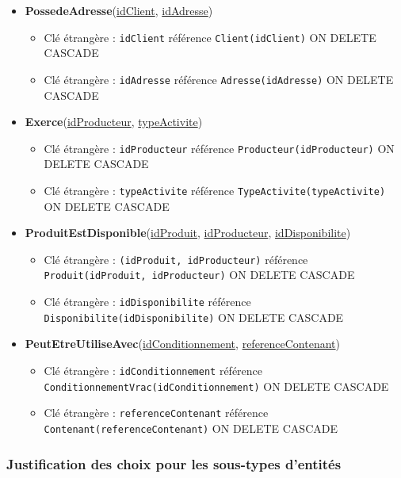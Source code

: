 \begin{itemize}
    \item \textbf{PossedeAdresse}(\underline{idClient}, \underline{idAdresse})
    \begin{itemize}
        \item Clé étrangère : \texttt{idClient} référence \texttt{Client(idClient)} ON DELETE CASCADE
        \item Clé étrangère : \texttt{idAdresse} référence \texttt{Adresse(idAdresse)} ON DELETE CASCADE
    \end{itemize}
    
    \item \textbf{Exerce}(\underline{idProducteur}, \underline{typeActivite})
    \begin{itemize}
        \item Clé étrangère : \texttt{idProducteur} référence \texttt{Producteur(idProducteur)} ON DELETE CASCADE
        \item Clé étrangère : \texttt{typeActivite} référence \texttt{TypeActivite(typeActivite)} ON DELETE CASCADE
    \end{itemize}
    
    \item \textbf{ProduitEstDisponible}(\underline{idProduit}, \underline{idProducteur}, \underline{idDisponibilite})
    \begin{itemize}
        \item Clé étrangère : \texttt{(idProduit, idProducteur)} référence \texttt{Produit(idProduit, idProducteur)} ON DELETE CASCADE
        \item Clé étrangère : \texttt{idDisponibilite} référence \texttt{Disponibilite(idDisponibilite)} ON DELETE CASCADE
    \end{itemize}
    
    \item \textbf{PeutEtreUtiliseAvec}(\underline{idConditionnement}, \underline{referenceContenant})
    \begin{itemize}
        \item Clé étrangère : \texttt{idConditionnement} référence \texttt{ConditionnementVrac(idConditionnement)} ON DELETE CASCADE
        \item Clé étrangère : \texttt{referenceContenant} référence \texttt{Contenant(referenceContenant)} ON DELETE CASCADE
    \end{itemize}
\end{itemize}

\subsubsection{Justification des choix pour les sous-types d'entités}

